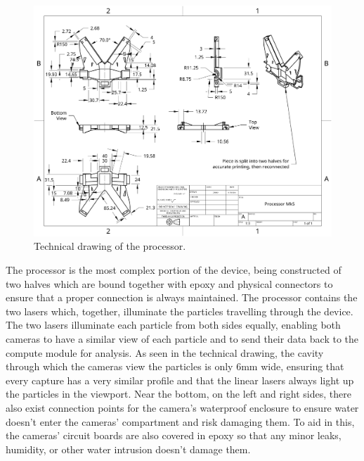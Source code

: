 \documentclass[fleqn,10pt]{SelfArx} %
\begin{document}
	\begin{figure}[h]
		\centering
		\includegraphics[width=1\linewidth]{Figures/TechProcessor}
		\caption[Processor Tech. Drawing]{Technical drawing of the processor.}
		\label{fig:techprocessor}
	\end{figure}
	The processor is the most complex portion of the device, being constructed of two halves which are bound together with epoxy and physical connectors to ensure that a proper connection is always maintained. The processor contains the two lasers which, together, illuminate the particles travelling through the device. The two lasers illuminate each particle from both sides equally, enabling both cameras to have a similar view of each particle and to send their data back to the compute module for analysis. As seen in the technical drawing, the cavity through which the cameras view the particles is only 6mm wide, ensuring that every capture has a very similar profile and that the linear lasers always light up the particles in the viewport. Near the bottom, on the left and right sides, there also exist connection points for the camera’s waterproof enclosure to ensure water doesn’t enter the cameras’ compartment and risk damaging them. To aid in this, the cameras’ circuit boards are also covered in epoxy so that any minor leaks, humidity, or other water intrusion doesn’t damage them. 
\end{document}
